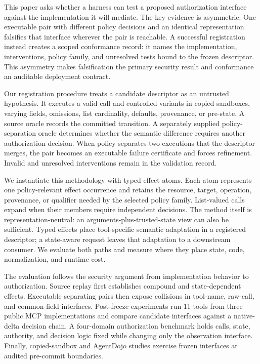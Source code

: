 This paper asks whether a harness can test a proposed authorization interface
against the implementation it will mediate. The key evidence is asymmetric.
One executable pair with different policy decisions and an identical
representation falsifies that interface wherever the pair is reachable. A
successful registration instead creates a scoped conformance record: it names
the implementation, interventions, policy family, and unresolved tests bound
to the frozen descriptor. This asymmetry makes falsification the primary
security result and conformance an auditable deployment contract.

Our registration procedure treats a candidate descriptor as an untrusted
hypothesis. It executes a valid call and controlled variants in copied
sandboxes, varying fields, omissions, list cardinality, defaults, provenance,
or pre-state. A source oracle records the committed transition. A separately
supplied policy-separation oracle determines whether the semantic difference
requires another authorization decision. When policy separates two executions
that the descriptor merges, the pair becomes an executable failure certificate
and forces refinement. Invalid and unresolved interventions remain in the
validation record.

We instantiate this methodology with typed effect atoms. Each atom represents
one policy-relevant effect occurrence and retains the resource, target,
operation, provenance, or qualifier needed by the selected policy family.
List-valued calls expand when their members require independent decisions. The
method itself is representation-neutral: an arguments-plus-trusted-state view
can also be sufficient. Typed effects place tool-specific semantic adaptation
in a registered descriptor; a state-aware request leaves that adaptation to a
downstream consumer. We evaluate both paths and measure where they place state,
code, normalization, and runtime cost.

The evaluation follows the security argument from implementation behavior to
authorization. Source replay first establishes compound and state-dependent
effects. Executable separating pairs then expose collisions in tool-name,
raw-call, and common-field interfaces. Post-freeze experiments run 11 tools
from three public MCP implementations and compare candidate interfaces against
a native-delta decision chain. A four-domain authorization benchmark holds
calls, state, authority, and decision logic fixed while changing only the
observation interface. Finally, copied-sandbox and AgentDojo studies exercise
frozen interfaces at audited pre-commit boundaries.

